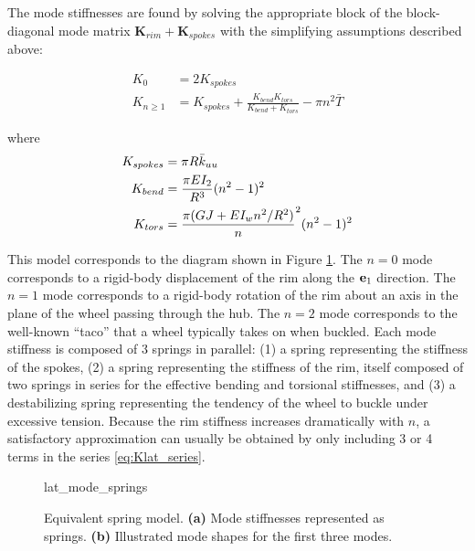 \documentclass[\rootdir/thesis.tex]{subfiles}
\begin{document}
The mode stiffnesses are found by solving the appropriate block of the block-diagonal mode matrix $\mathbf{K}_{rim} + \mathbf{K}_{spokes}$ with the simplifying assumptions described above:

\begin{subequations}
\begin{align}
K_0 &= 2 K_{spokes}\\
K_{n\geq1} & = K_{spokes} + \frac{K_{bend}K_{tors}}{K_{bend} + K_{tors}} - \pi n^2 \bar{T}\label{eq:Kn}
\end{align}
\end{subequations}

where
\begin{align*}
K_{spokes} &= \pi R \bar{k}_{uu}\\
K_{bend} &= \frac{\pi EI_2}{R^3} (n^2-1)^2\\
K_{tors} &= \frac{\pi (GJ + EI_w n^2/R^2)}n^2(n^2-1)^2
\end{align*}

This model corresponds to the diagram shown in Figure \ref{fig:lat_mode_springs}. The $n=0$ mode corresponds to a rigid-body displacement of the rim along the $\mathbf{e}_1$ direction. The $n=1$ mode corresponds to a rigid-body rotation of the rim about an axis in the plane of the wheel passing through the hub. The $n=2$ mode corresponds to the well-known ``taco'' that a wheel typically takes on when buckled. Each mode stiffness is composed of 3 springs in parallel: (1) a spring representing the stiffness of the spokes, (2) a spring representing the stiffness of the rim, itself composed of two springs in series for the effective bending and torsional stiffnesses, and (3) a destabilizing spring representing the tendency of the wheel to buckle under excessive tension. Because the rim stiffness increases dramatically with $n$, a satisfactory approximation can usually be obtained by only including 3 or 4 terms in the series \eqref{eq:Klat_series}.

\begin{figure}[h]
\centering
{lat_mode_springs}
\caption{Equivalent spring model. \textbf{(a)} Mode stiffnesses represented as springs. \textbf{(b)} Illustrated mode shapes for the first three modes.}
\label{fig:lat_mode_springs}
\end{figure}
\end{document}
